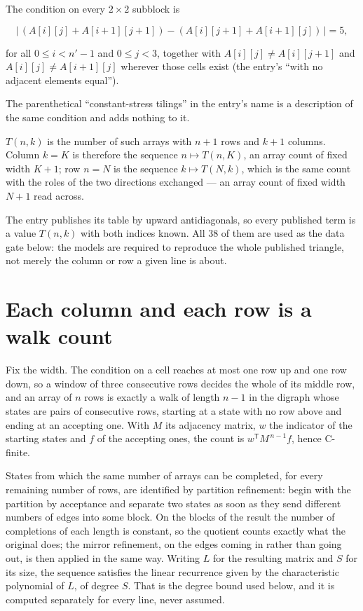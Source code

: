 \documentclass[11pt]{article}
\theoremstyle{definition}
\begin{document}
The condition on every $2 \times 2$ subblock is

\[\bigl|\,(A[i][j] + A[i{+}1][j{+}1]) - (A[i][j{+}1] + A[i{+}1][j])\,\bigr| = 5,\]

for all $0 \le i < n'-1$ and $0 \le j < 3$, together with $A[i][j] \ne A[i][j{+}1]$ and $A[i][j] \ne A[i{+}1][j]$ wherever those cells exist (the entry's ``with no adjacent elements equal'').

The parenthetical ``constant-stress tilings'' in the entry's name is a description of the same condition and adds nothing to it.

$T(n,k)$ is the number of such arrays with $n + 1$ rows and $k + 1$ columns. Column $k = K$ is therefore the sequence $n \mapsto T(n,K)$, an array count of fixed width $K + 1$; row $n = N$ is the sequence $k \mapsto T(N,k)$, which is the same count with the roles of the two directions exchanged --- an array count of fixed width $N + 1$ read across.

The entry publishes its table by upward antidiagonals, so every published term is a value $T(n,k)$ with both indices known. All 38 of them are used as the data gate below: the models are required to reproduce the whole published triangle, not merely the column or row a given line is about.

\section{Each column and each row is a walk count}

Fix the width. The condition on a cell reaches at most one row up and one row down, so a window of three consecutive rows decides the whole of its middle row, and an array of $n$ rows is exactly a walk of length $n-1$ in the digraph whose states are pairs of consecutive rows, starting at a state with no row above and ending at an accepting one. With $M$ its adjacency matrix, $w$ the indicator of the starting states and $f$ of the accepting ones, the count is $w^{\mathsf T}M^{\,n-1}f$, hence C-finite.

States from which the same number of arrays can be completed, for every remaining number of rows, are identified by partition refinement: begin with the partition by acceptance and separate two states as soon as they send different numbers of edges into some block. On the blocks of the result the number of completions of each length is constant, so the quotient counts exactly what the original does; the mirror refinement, on the edges coming in rather than going out, is then applied in the same way. Writing $L$ for the resulting matrix and $S$ for its size, the sequence satisfies the linear recurrence given by the characteristic polynomial of $L$, of degree $S$. That is the degree bound used below, and it is computed separately for every line, never assumed.
\end{document}
